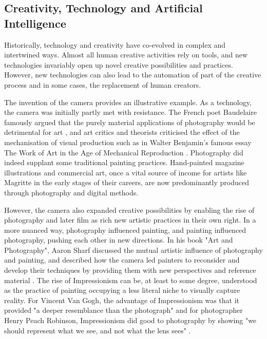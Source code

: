 \subsection{Creativity, Technology and Artificial Intelligence}

Historically, technology and creativity have co-evolved in complex and intertwined ways. Almost all human creative activities rely on tools, and new technologies invariably open up novel creative possibilities and practices. However, new technologies can also lead to the automation of part of the creative process and in some cases, the replacement of human creators.

The invention of the camera provides an illustrative example. As a technology, the camera was initially partly met with resistance. The French poet Baudelaire famously argued that the purely material applications of photography would be detrimental for art \cite{Baudelaire1955-ae}, and art critics and theorists criticised the effect of the mechanisation of visual production such as in Walter Benjamin's famous essay The Work of Art in the Age of Mechanical Reproduction \cite{Benjamin1935-wd}. Photography did indeed supplant some traditional painting practices. Hand-painted magazine illustrations and commercial art, once a vital source of income for artists like Magritte in the early stages of their careers, are now predominantly produced through photography and digital methods. 

However, the camera also expanded creative possibilities by enabling the rise of photography and later film as rich new artistic practices in their own right. In a more nuanced way, photography influenced painting, and painting influenced photography, pushing each other in new directions. In his book "Art and Photography", Aaron Sharf discussed the mutual artistic influence of photography and painting, and described how the camera led painters to reconsider and develop their techniques by providing them with new perspectives and reference material \cite{Scharf1968-na}. The rise of Impressionism can be, at least to some degree, understood as the practice of painting occupying a less literal niche to visually capture reality. For Vincent Van Gogh, the advantage of Impressionism was that it provided "a deeper resemblance than the photograph" \cite[p. 116]{Marmor1997-ka} and for photographer Henry Peach Robinson, Impressionism did good to photography by showing "we should represent what we see, and not what the lens sees" \cite[p. 87]{Robinson1896-mo}. 

